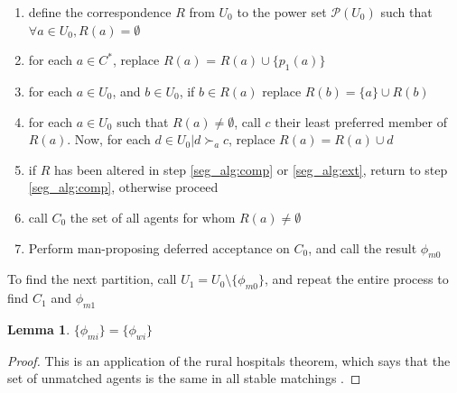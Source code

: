 \documentclass[WP]{AEA}
\newtheorem{lemma}{Lemma}
\begin{document}
\begin{enumerate}
	\item define the correspondence $R$ from $U_0$ to the power set $\mathcal{P}(U_0)$ such that $\forall a \in U_0, R(a) = \emptyset$
	\item for each $a \in C^*$, replace $R(a)$ =  $R(a) \cup \{p_1(a)\}$
	\item  \label{seg_alg:comp} for each $a \in U_0$, and $b \in U_0$, if $ b \in R(a)$ replace $R(b) = \{a\} \cup R(b)$
	\item  \label{seg_alg:ext} for each $a \in U_0$ such that $R(a) \neq \emptyset$, call  $c$ their least preferred member of $R(a)$. Now, for each $d \in U_0 | d \succ_a c$, replace $R(a) = R(a) \cup d$ 
	\item if $R$ has been altered in step \ref*{seg_alg:comp} or \ref*{seg_alg:ext}, return to step \ref*{seg_alg:comp}, otherwise proceed
	\item call $C_0$ the set of all agents for whom $R(a) \neq \emptyset$
	\item Perform man-proposing deferred acceptance on $C_0$, and call the result $\phi_{m0}$
\end{enumerate}

To find the next partition, call $U_1 = U_0 \setminus \{\phi_{m0}\}$, and repeat the entire process to find $C_1$ and $\phi_{m1}$

\begin{lemma}
	$\{\phi_{mi}\}=\{\phi_{wi}\}$
\end{lemma}
\begin{proof}
	This is an application of the rural hospitals theorem, which says that the set of unmatched agents is the same in all stable matchings \cite{Roth1986}.
\end{proof}
\end{document}
